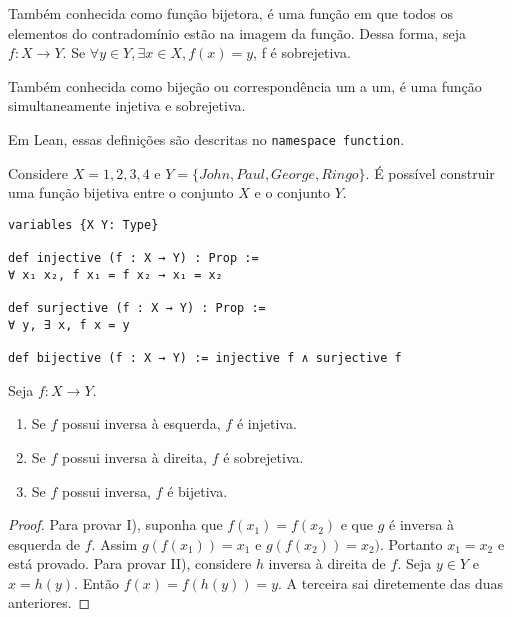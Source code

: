 \begin{definition}
    \label{def6}
    Também conhecida como função bijetora, é uma função em que todos os elementos do contradomínio 
    estão na imagem da função. Dessa forma, seja $f: X \to Y$. Se $\forall y \in Y, \exists x \in X, f(x) = y$, 
    f é sobrejetiva. 
   \end{definition}

\begin{definition}
    \label{def7}
    Também conhecida como bijeção ou correspondência um a um, é uma função simultaneamente injetiva e 
    sobrejetiva. 
\end{definition}

Em Lean, essas definições são descritas no \lstinline{namespace function}. 

\begin{example}
    Considere $X = {1,2,3,4}$ e $Y = \{John, Paul, George, Ringo\}$. É possível construir uma função bijetiva 
    entre o conjunto $X$ e o conjunto $Y$.  
\end{example}

\begin{lstlisting}
variables {X Y: Type}

def injective (f : X → Y) : Prop :=
∀ x₁ x₂, f x₁ = f x₂ → x₁ = x₂

def surjective (f : X → Y) : Prop :=
∀ y, ∃ x, f x = y

def bijective (f : X → Y) := injective f ∧ surjective f
\end{lstlisting}

\begin{theorem}
    \label{prop5}
    Seja $f : X \to Y$.
    \renewcommand{\labelenumi}{\Roman{enumi}}
    \begin{enumerate}
        \item Se $f$ possui inversa à esquerda, $f$ é injetiva.
        \item Se $f$ possui inversa à direita, $f$ é sobrejetiva. 
        \item Se $f$ possui inversa, $f$ é bijetiva. 
    \end{enumerate}
\end{theorem}
\begin{proof}
    Para provar I), suponha que $f(x_1) = f(x_2)$ e que $g$ é inversa à esquerda
    de $f$. Assim $g(f(x_1)) = x_1$ e $g(f(x_2)) = x_2)$. Portanto $x_1 = x_2$ e 
    está provado. Para provar II), considere $h$ inversa à direita de $f$. Seja 
    $y \in Y$ e $x = h(y)$. Então $f(x) = f(h(y)) = y$. A terceira sai diretemente 
    das duas anteriores.  
\end{proof}

